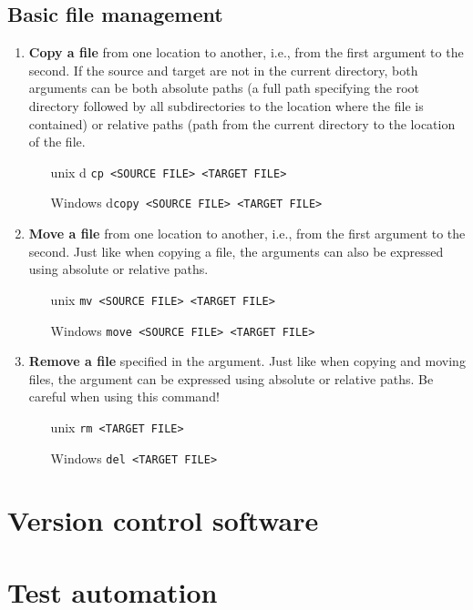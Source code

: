\documentclass{scrreprt}
\begin{document}
\section{Basic file management}
\begin{enumerate}
\item \textbf{Copy a file} from one location to another, i.e., from the first argument to the second. If the source and target are not in the current directory, both arguments can be both absolute paths (a full path specifying  the root directory followed by all subdirectories to the location where the file is contained) or relative paths (path from the current directory to the location of the file.
\begin{itemize}
\item[unix]d \texttt{cp <SOURCE FILE> <TARGET FILE>}
\item[Windows] d\texttt{copy <SOURCE FILE> <TARGET FILE>}
\end{itemize}
\item \textbf{Move a file} from one location to another, i.e., from the first argument to the second. Just like when copying a file, the arguments can also be expressed using absolute or relative paths.
\begin{itemize}
\item[unix] \texttt{mv <SOURCE FILE> <TARGET FILE>}
\item[Windows] \texttt{move <SOURCE FILE> <TARGET FILE>}
\end{itemize}
\item \textbf{Remove a file} specified in the argument. Just like when copying and moving files, the argument can be expressed using absolute or relative paths. Be careful when using this command!
\begin{itemize}
\item[unix] \texttt{rm <TARGET FILE>}
\item[Windows] \texttt{del <TARGET FILE>}
\end{itemize}
\end{enumerate}

\chapter{Version control software}

\chapter{Test automation}
\end{document}
